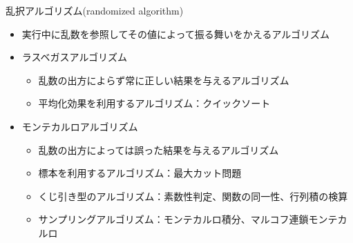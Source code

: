 \begin{frame}[t,fragile]{乱択アルゴリズム(randomized algorithm)}
  \begin{itemize}
  \item 実行中に乱数を参照してその値によって振る舞いをかえるアルゴリズム
  \item ラスベガスアルゴリズム
    \begin{itemize}
    \item 乱数の出方によらず常に正しい結果を与えるアルゴリズム
    \item 平均化効果を利用するアルゴリズム：クイックソート
    \end{itemize}
  \item モンテカルロアルゴリズム
    \begin{itemize}
    \item 乱数の出方によっては誤った結果を与えるアルゴリズム
    \item 標本を利用するアルゴリズム：最大カット問題
    \item くじ引き型のアルゴリズム：素数性判定、関数の同一性、行列積の検算
    \item サンプリングアルゴリズム：モンテカルロ積分、マルコフ連鎖モンテカルロ
    \end{itemize}
  \end{itemize}
\end{frame}
